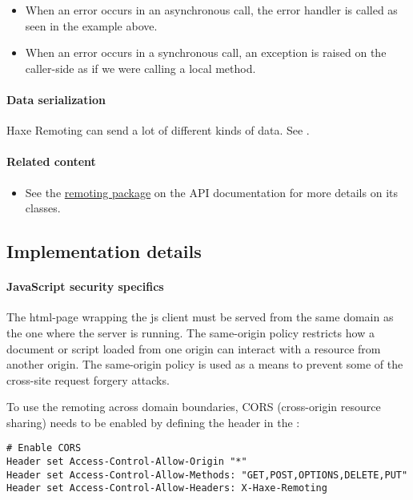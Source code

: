 \begin{itemize}
	\item When an error occurs in an asynchronous call, the error handler is called as seen in the example above.
	\item When an error occurs in a synchronous call, an exception is raised on the caller-side as if we were calling a local method.
\end{itemize}

\paragraph{Data serialization}

Haxe Remoting can send a lot of different kinds of data. See .


\paragraph{Related content}
\begin{itemize}
	\item See the \href{https://api.haxe.org/haxe/remoting/}{remoting package} on the API documentation for more details on its classes.
\end{itemize}

\subsection{Implementation details}
\label{std-remoting-implementation-details}

\paragraph{JavaScript security specifics}

The html-page wrapping the js client must be served from the same domain as the one where the server is running. The same-origin policy restricts how a document or script loaded from one origin can interact with a resource from another origin. The same-origin policy is used as a means to prevent some of the cross-site request forgery attacks.

To use the remoting across domain boundaries, CORS (cross-origin resource sharing) needs to be enabled by defining the header  in the :

\begin{lstlisting}
# Enable CORS
Header set Access-Control-Allow-Origin "*"
Header set Access-Control-Allow-Methods: "GET,POST,OPTIONS,DELETE,PUT"
Header set Access-Control-Allow-Headers: X-Haxe-Remoting
\end{lstlisting} 

